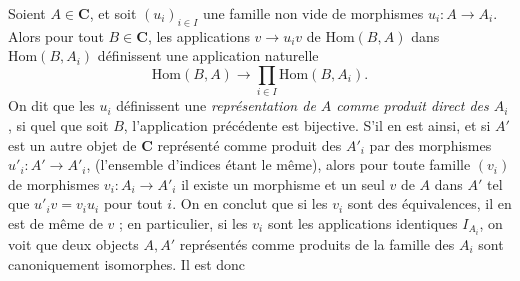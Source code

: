 Soient $A\in\mathbf{C}$, et soit $(u_i)_{i\in I}$ une famille non vide de morphismes
$u_i:A\to A_i$. Alors pour tout $B\in\mathbf{C}$, les applications
$v\to u_iv$ de $\mathrm{Hom}(B,A)$ dans $\mathrm{Hom}(B,A_i)$
définissent une application naturelle
\[
  \mathrm{Hom}(B,A)\to
  \prod_{i\in I}\mathrm{Hom}(B,A_i).
\]
On dit que les $u_i$ définissent une \textit{représentation de $A$ comme
produit direct des $A_i$}, si quel que soit $B$, l'application précédente est
bijective. S'il en est ainsi, et si $A'$ est un autre objet de $\mathbf{C}$ représenté
comme produit des $A'_i$ par des morphismes
$u'_i:A'\to A'_i$, (l'ensemble d'indices étant le même), alors
pour toute famille $(v_i)$ de morphismes $v_i:A_i\to A'_i$ il
existe un morphisme et un seul $v$ de $A$ dans $A'$ tel que
$u'_iv=v_iu_i$ pour tout $i$. On en conclut que si les $v_i$ sont des
équivalences, il en est de même de $v$ ; en particulier, si les $v_i$ sont les
applications identiques $I_{A_i}$, on voit que deux objects $A,A'$ représentés
comme produits de la famille des $A_i$ sont canoniquement isomorphes. Il est
donc

